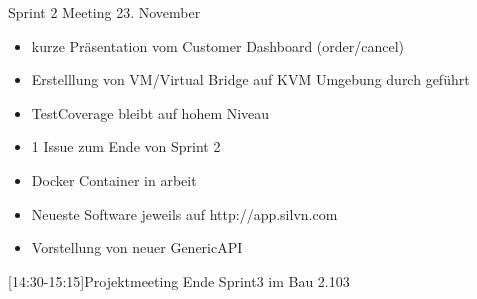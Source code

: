 
\begin{Protokoll}{Sprint 2 Meeting 23. November}
\fehlendEntschuldigt{}
\protokollKopf

\begin{itemize}
  \item kurze Präsentation vom Customer Dashboard (order/cancel)
  \item Erstelllung von VM/Virtual Bridge auf KVM Umgebung durch geführt
\end{itemize}


\begin{itemize}
  \item TestCoverage bleibt auf hohem Niveau
  \item 1 Issue zum Ende von Sprint 2
\end{itemize}

\begin{itemize}
  \item Docker Container in arbeit
  \item Neueste Software jeweils auf http://app.silvn.com
\end{itemize}

\begin{itemize}
  \item Vorstellung von neuer GenericAPI
\end{itemize}


[14:30-15:15]{Projektmeeting Ende Sprint3 im Bau 2.103}



\end{Protokoll}

